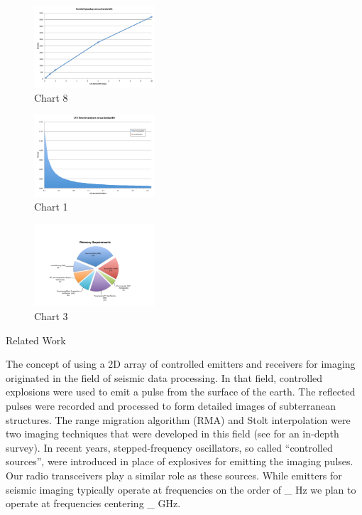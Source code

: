 \documentclass[twocolumn]{article}
\makeatletter
\def\section{\@startsection{section}{1}{\z@}{24pt plus 2 pt
minus 2 pt} {12pt plus 2pt minus 2pt}{\large\bf}}
\makeatother
\begin{document}
\begin{figure}[!h]
\centering
\includegraphics*[width=0.4\textwidth]{figures/chart8.pdf}
\caption{Chart 8}
\label{comm_patterns_arrows}
\end{figure}

\begin{figure}[!h]
\centering
\includegraphics*[width=0.4\textwidth]{figures/chart1.pdf}
\caption{Chart 1}
\label{chart1}
\end{figure}

\begin{figure}[!h]
\centering
\includegraphics*[width=0.4\textwidth]{figures/chart3.pdf}
\caption{Chart 3}
\label{comm_patterns_arrows}
\end{figure}

\section{Related Work}

The concept of using a 2D array of controlled emitters and receivers for imaging originated in the field of seismic data processing. In that field, controlled explosions were used to emit a pulse from the surface of the earth. The reflected pulses were recorded and processed to form detailed images of subterranean structures. The range migration algorithm (RMA) and Stolt interpolation were two imaging techniques that were developed in this field (see \cite{gazdag1984migration} for an in-depth survey). In recent years, stepped-frequency oscillators, so called ``controlled sources'', were introduced in place of explosives for emitting the imaging pulses. Our radio transceivers play a similar role as these sources. While emitters for seismic imaging typically operate at frequencies on the order of \_ Hz we plan to operate at frequencies centering \_ GHz.
\end{document}
